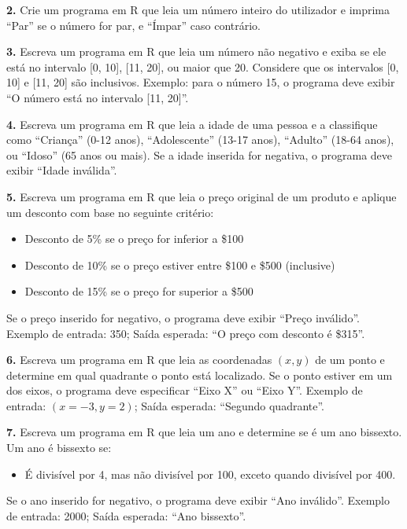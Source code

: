 \documentclass[
]{book}
\providecommand{\tightlist}{%
  \setlength{\itemsep}{0pt}\setlength{\parskip}{0pt}}
\begin{document}
\textbf{2.} Crie um programa em R que leia um número inteiro do utilizador e
imprima ``Par'' se o número for par, e ``Ímpar'' caso contrário.

\textbf{3.} Escreva um programa em R que leia um número não negativo e exiba se ele está
no intervalo {[}0, 10{]}, {[}11, 20{]}, ou maior que 20. Considere que os
intervalos {[}0, 10{]} e {[}11, 20{]} são inclusivos. Exemplo: para o número 15,
o programa deve exibir ``O número está no intervalo {[}11, 20{]}''.

\textbf{4.} Escreva um programa em R que leia a idade de uma pessoa e a
classifique como ``Criança'' (0-12 anos), ``Adolescente'' (13-17 anos),
``Adulto'' (18-64 anos), ou ``Idoso'' (65 anos ou mais). Se a idade inserida
for negativa, o programa deve exibir ``Idade inválida''.

\textbf{5.} Escreva um programa em R que leia o preço original de um produto
e aplique um desconto com base no seguinte critério:

\begin{itemize}
\item
  Desconto de 5\% se o preço for inferior a \$100
\item
  Desconto de 10\% se o preço estiver entre \$100 e \$500 (inclusive)
\item
  Desconto de 15\% se o preço for superior a \$500
\end{itemize}

Se o preço inserido for negativo, o programa deve exibir ``Preço
inválido''. Exemplo de entrada: 350; Saída esperada: ``O preço com
desconto é \$315''.

\textbf{6.} Escreva um programa em R que leia as coordenadas \((x, y)\) de um
ponto e determine em qual quadrante o ponto está localizado. Se o ponto
estiver em um dos eixos, o programa deve especificar ``Eixo X'' ou ``Eixo
Y''. Exemplo de entrada: \((x = -3, y = 2)\); Saída esperada: ``Segundo
quadrante''.

\textbf{7.} Escreva um programa em R que leia um ano e determine se é um ano
bissexto. Um ano é bissexto se:

\begin{itemize}
\tightlist
\item
  É divisível por 4, mas não divisível por 100, exceto quando
  divisível por 400.
\end{itemize}

Se o ano inserido for negativo, o programa deve exibir ``Ano inválido''.
Exemplo de entrada: 2000; Saída esperada: ``Ano bissexto''.
\end{document}
